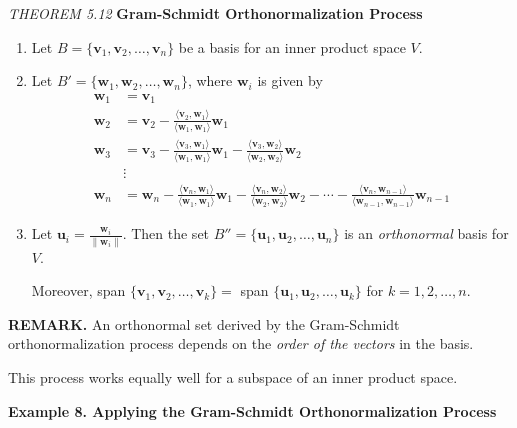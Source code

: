 \documentclass{article}
\newcommand\B{\textbf}
\newcommand\tcl{\begin{tcolorbox}[colback = {blue9}]}
\newcommand\etcl{\end{tcolorbox}}
\newcommand\T{\textit}
\newcommand\la{\langle}
\newcommand\ra{\rangle}
\begin{document}
    \tcl
        \T{THEOREM 5.12} \B{Gram-Schmidt Orthonormalization Process}
        \begin{enumerate}
            \item Let $B = \{ \B{v}_1, \B{v}_2, \dots, \B{v}_n \}$ be a basis for an inner product space $V$.
            \item Let $B' = \{ \B{w}_1, \B{w}_2, \dots, \B{w}_n \}$, where $\B{w}_i$ is given by
                \begin{equation*}
                    \begin{split}
                        \B{w}_1 & = \B{v}_1 \\
                        \B{w}_2 & = \B{v}_2 - \frac{\la \B{v}_2, \B{w}_1\ra}{\la \B{w}_1, \B{w}_1\ra} \B{w}_1\\
                        \B{w}_3 & = \B{v}_3 - \frac{\la \B{v}_3, \B{w}_1\ra}{\la \B{w}_1, \B{w}_1\ra} \B{w}_1
                        - \frac{\la \B{v}_3, \B{w}_2\ra}{\la \B{w}_2, \B{w}_2\ra} \B{w}_2 \\
                                & \vdots \\
                        \B{w}_n & = \B{w}_n - \frac{\la \B{v}_n, \B{w}_1\ra}{\la \B{w}_1, \B{w}_1\ra} \B{w}_1
                        - \frac{\la \B{v}_n, \B{w}_2\ra}{\la \B{w}_2, \B{w}_2\ra} \B{w}_2  - \cdots 
                        - \frac{\la \B{v}_n, \B{w}_{n-1}\ra}{\la \B{w}_{n-1}, \B{w}_{n-1}\ra} \B{w}_{n-1}
                    \end{split}
                \end{equation*}
            \item Let $\B{u}_i = \frac{\B{w}_i}{\| \B{w}_i \|}$. Then the set $B'' = \{ \B{u}_1, \B{u}_2, \dots, \B{u}_n \}$
                is an \T{orthonormal} basis for $V$. 

                Moreover, span $\{ \B{v}_1, \B{v}_2, \dots, \B{v}_k \} =$
                span $\{ \B{u}_1, \B{u}_2, \dots, \B{u}_k \}$ for $k = 1, 2, \dots, n$.
        \end{enumerate}
    \etcl 
    \B{REMARK. } An orthonormal set derived by the Gram-Schmidt orthonormalization process depends on
    the \textit{order of the vectors} in the basis.

    This process works equally well for a subspace of an inner product space.

    \B{Example 8. Applying the Gram-Schmidt Orthonormalization Process}
\end{document}
